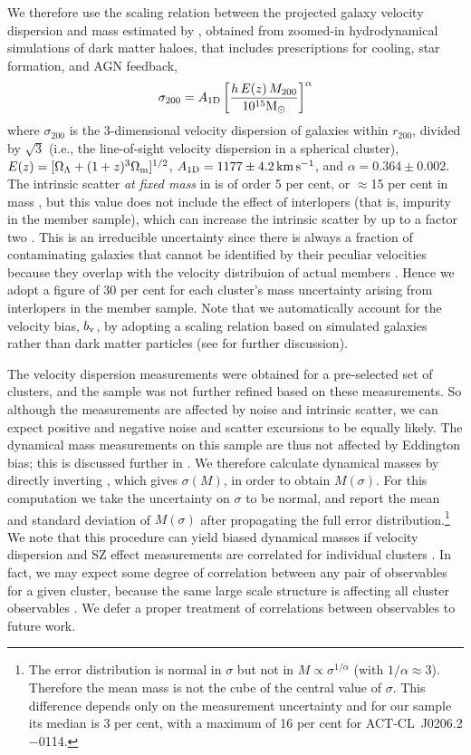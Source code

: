 We therefore use the scaling relation between the projected galaxy velocity dispersion and mass 
estimated by \cite{munari13}, obtained from zoomed-in hydrodynamical simulations of dark matter 
haloes, that includes prescriptions for cooling, star formation, and AGN feedback,
\begin{equation}\label{eq:munari}
 \sigma_{\rm 200} = A_{\rm 1D} \left[\frac{h\,E(z)\,M_{200}}{10^{15}{\rm M}_\odot}\right]^\alpha
\end{equation}
where $\sigma_{200}$ is the 3-dimensional velocity dispersion of galaxies within $r_{200}$, 
divided by $\sqrt{3}$ (i.e., the line-of-sight velocity dispersion in a spherical cluster), 
$E(z)=[\Omega_\Lambda + (1+z)^3\Omega_{\rm m}]^{1/2}$, $A_{\rm 
1D}=1177\pm4.2\,\mathrm{km\,s^{-1}}$, and $\alpha=0.364\pm0.002$. The intrinsic scatter \emph{at 
fixed mass} in  is of order 5 per cent, or $\approx$15 per cent in mass 
\citep{munari13}, but this value does not include the effect of interlopers (that is, impurity in 
the member sample), which can increase the intrinsic scatter by up to a factor two 
\citep{biviano06,mamon10,white10,saro13}. This is an irreducible uncertainty since there is always a 
fraction of contaminating galaxies that cannot be identified by their peculiar velocities because 
they overlap with the velocity distribuion of actual members \citep[see, e.g., figure 10 
of][]{white10}. Hence we adopt a figure of 30 per cent for each cluster's mass uncertainty arising from interlopers in the member sample. Note that we automatically account for the velocity bias, $b_{\rm v}$, by adopting a scaling relation based on simulated galaxies rather than dark matter particles (see  for further discussion).

The velocity dispersion measurements were obtained for a pre-selected set of clusters, and the 
sample was not further refined based on these measurements. So although the measurements are 
affected by noise and intrinsic scatter, we can expect positive and negative noise and scatter 
excursions to be equally likely. The dynamical mass measurements on this sample are thus not 
affected by Eddington bias; this is discussed further in . We therefore
calculate dynamical masses by directly inverting , which gives $\sigma(M)$, in 
order to obtain $M(\sigma)$. For this computation we take the uncertainty on $\sigma$ to be 
normal, and report the mean and standard deviation of $M(\sigma)$ after propagating the full error 
distribution.\footnote{The error distribution is normal in $\sigma$ but not in 
$M\propto\sigma^{1/\alpha}$ (with $1/\alpha\approx3$). Therefore the mean mass is not the cube of 
the central value of $\sigma$. This difference depends only on the measurement uncertainty and for 
our sample its median is 3 per cent, with a maximum of 16 per cent for ACT-CL~J0206.2$-$0114.} We note that this procedure can yield biased dynamical masses if velocity dispersion and SZ effect measurements are correlated for individual clusters \citep{evrard14}. In fact, we may expect some degree of correlation between any pair of observables for a given cluster, because the same large scale structure is affecting all cluster observables \citep{white10}. We defer a proper treatment of correlations between observables to future work.

